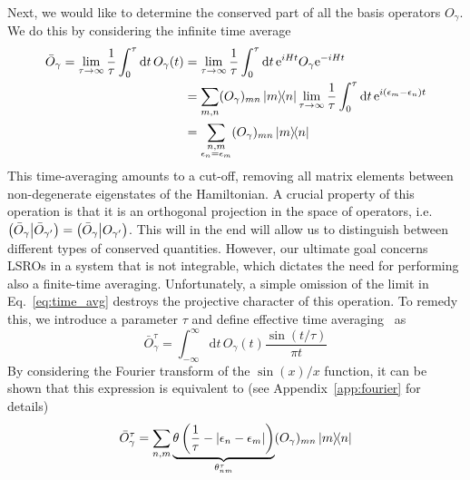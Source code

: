 Next, we would like to determine the conserved part of all the basis operators \(O_{\gamma}\). We do this
by considering the infinite time average
\begin{align}
  \bar{O}_{\gamma} = \lim_{\tau\to\infty}\frac{1}{\tau} \int_0^{\tau} \mathrm{d}t\, O_{\gamma}(t) & =
  \lim_{\tau\to\infty}\frac{1}{\tau} \int_0^{\tau} \mathrm{d}t\, \mathrm{e}^{i H t}O_{\gamma} \mathrm{e}^{-i H t} \nonumber                                                                                                                                       \\
                                                                                                  & = \sum_{m,n} (O_{\gamma})_{mn}\ketbra{m}{n} \lim_{\tau\to\infty} \frac{1}{\tau} \int_0^{\tau} \mathrm{d}t \, \mathrm{e}^{i(\epsilon_m-\epsilon_n)t} \nonumber \\
                                                                                                  & = \sum_{\substack{n,m                                                                                                                                         \\ \epsilon_n = \epsilon_m}} (O_{\gamma})_{mn}\ketbra{m}{n}
  \label{eq:time_avg}
\end{align}
This time-averaging amounts to a cut-off, removing all matrix elements between non-degenerate eigenstates
of the Hamiltonian. A crucial property of this operation is that it is an orthogonal projection
in the space of operators, i.e. \(\left(\bar{O}_{\gamma} \middle| \bar{O}_{\gamma^{\prime}}\right) = \left(\bar{O}_{\gamma} \middle| O_{\gamma^{\prime}}\right)\). This will
in the end will allow us to distinguish between different types of conserved quantities.
However, our ultimate goal concerns LSROs in a system that is not integrable, which dictates the
need for performing also a finite-time averaging. Unfortunately, a simple omission of the limit
in Eq.~\eqref{eq:time_avg} destroys the projective character of this operation. To remedy this,
we introduce a parameter \(\tau\) and define effective time averaging~\autocite{Mierzejewski2015}
as
\begin{equation}
  \bar{O}_{\gamma}^{\tau} = \int_{-\infty}^{\infty} \mathrm{d}t\, O_{\gamma}(t) \frac{\sin(t/\tau)}{\pi t}
  \label{eq:finite_time_avg_integral}
\end{equation}
By considering the Fourier transform of the \(\sin(x)/x\) function, it can be shown that
this expression is equivalent to (see Appendix~\ref{app:fourier} for details)
\begin{equation}
  \bar{O}_{\gamma}^{\tau} = \sum_{n,m} \underbrace{\theta\left(\frac{1}{\tau} - |\epsilon_n - \epsilon_m|\right)}_{\theta_{nm}^{\tau}} (O_{\gamma})_{mn} \ketbra{m}{n}
  \label{eq:finite_time_avg}
\end{equation}
